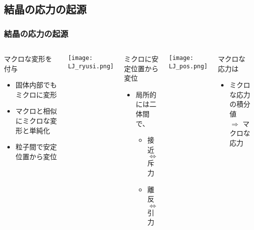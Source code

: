 \documentclass[12pt, dvipdfmx]{beamer}
\begin{document}
\subsection{結晶の応力の起源}
\begin{frame}
	\frametitle{結晶の応力の起源}
		\vspace{-3mm}
		\begin{columns}[T, onlytextwidth]
				\begin{exampleblock}{マクロな変形を付与}
						\begin{itemize}
							\item 固体内部でもミクロに変形
							\item マクロと相似にミクロな変形と単純化
							\item 粒子間で安定位置から変位
						\end{itemize}
				\end{exampleblock}
				\begin{center}
					\texttt{[image: LJ\_ryusi.png]}
				\end{center}
				\begin{block}{ミクロに安定位置から変位}
					\begin{itemize}
						\item 局所的には二体間で、
						\begin{itemize}
							\item 接近 $\Leftrightarrow$ 斥力
							\item 離反 $\Leftrightarrow$ 引力
						\end{itemize}
					\end{itemize}
				\end{block}
				\begin{center}
					\texttt{[image: LJ\_pos.png]}
				\end{center}
				\begin{alertblock}{マクロな応力は}
					\begin{itemize}
						\item ミクロな応力の積分値\\$\Rightarrow$ \alert{マクロな応力}
					\end{itemize}
				\end{alertblock}
		\end{columns}
\end{frame}
\end{document}

